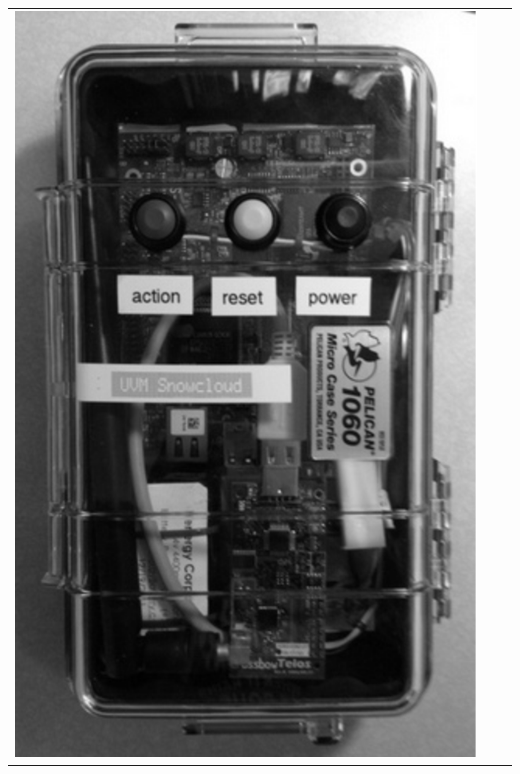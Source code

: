 {\begin{fpfig}[t]
\begin{center}
\begin{tabular}{ccc}
\includegraphics[scale=.35]{Figures/harvester.eps} 
\end{tabular}
\end{center}
\end{fpfig}
}


